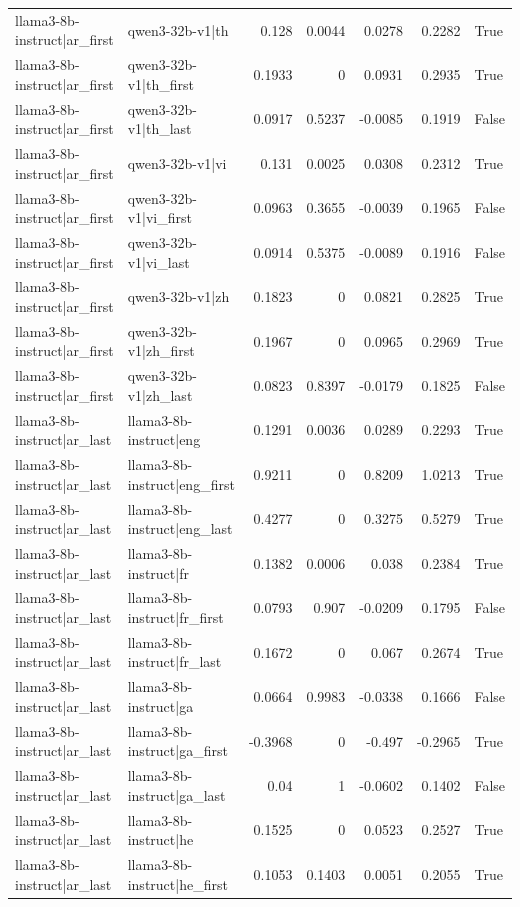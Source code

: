 \begin{table}
\begin{tabular}{l l r r r r l}
llama3-8b-instruct|ar_first & qwen3-32b-v1|th & 0.128 & 0.0044 & 0.0278 & 0.2282 & True \\
llama3-8b-instruct|ar_first & qwen3-32b-v1|th_first & 0.1933 & 0 & 0.0931 & 0.2935 & True \\
llama3-8b-instruct|ar_first & qwen3-32b-v1|th_last & 0.0917 & 0.5237 & -0.0085 & 0.1919 & False \\
llama3-8b-instruct|ar_first & qwen3-32b-v1|vi & 0.131 & 0.0025 & 0.0308 & 0.2312 & True \\
llama3-8b-instruct|ar_first & qwen3-32b-v1|vi_first & 0.0963 & 0.3655 & -0.0039 & 0.1965 & False \\
llama3-8b-instruct|ar_first & qwen3-32b-v1|vi_last & 0.0914 & 0.5375 & -0.0089 & 0.1916 & False \\
llama3-8b-instruct|ar_first & qwen3-32b-v1|zh & 0.1823 & 0 & 0.0821 & 0.2825 & True \\
llama3-8b-instruct|ar_first & qwen3-32b-v1|zh_first & 0.1967 & 0 & 0.0965 & 0.2969 & True \\
llama3-8b-instruct|ar_first & qwen3-32b-v1|zh_last & 0.0823 & 0.8397 & -0.0179 & 0.1825 & False \\
llama3-8b-instruct|ar_last & llama3-8b-instruct|eng & 0.1291 & 0.0036 & 0.0289 & 0.2293 & True \\
llama3-8b-instruct|ar_last & llama3-8b-instruct|eng_first & 0.9211 & 0 & 0.8209 & 1.0213 & True \\
llama3-8b-instruct|ar_last & llama3-8b-instruct|eng_last & 0.4277 & 0 & 0.3275 & 0.5279 & True \\
llama3-8b-instruct|ar_last & llama3-8b-instruct|fr & 0.1382 & 0.0006 & 0.038 & 0.2384 & True \\
llama3-8b-instruct|ar_last & llama3-8b-instruct|fr_first & 0.0793 & 0.907 & -0.0209 & 0.1795 & False \\
llama3-8b-instruct|ar_last & llama3-8b-instruct|fr_last & 0.1672 & 0 & 0.067 & 0.2674 & True \\
llama3-8b-instruct|ar_last & llama3-8b-instruct|ga & 0.0664 & 0.9983 & -0.0338 & 0.1666 & False \\
llama3-8b-instruct|ar_last & llama3-8b-instruct|ga_first & -0.3968 & 0 & -0.497 & -0.2965 & True \\
llama3-8b-instruct|ar_last & llama3-8b-instruct|ga_last & 0.04 & 1 & -0.0602 & 0.1402 & False \\
llama3-8b-instruct|ar_last & llama3-8b-instruct|he & 0.1525 & 0 & 0.0523 & 0.2527 & True \\
llama3-8b-instruct|ar_last & llama3-8b-instruct|he_first & 0.1053 & 0.1403 & 0.0051 & 0.2055 & True \\

\end{tabular}
\end{table}
